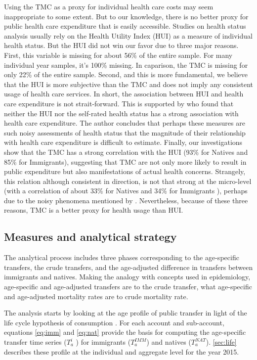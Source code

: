\vspace{0.7em}\par
Using the TMC as a proxy for individual health care costs may seem inappropriate to some extent.
But to our knowledge, there is no better proxy for public health care expenditure that is easily accessible.
Studies on health status analysis usually rely on the Health Utility Index (HUI) as a measure of individual health status.
But the HUI did not win our favor due to three major reasons.
First, this variable is missing for about 56\% of the entire sample.
For many individual year samples, it's 100\% missing.
In caparison, the TMC is missing for only 22\% of the entire sample.
Second, and this is more fundamental, we believe that the HUI is more subjective than the TMC and does not imply any consistent usage of health care services.
In short, the association between HUI and health care expenditure is not strait-forward.
This is supported by \citet{Pierard:2016ik} who found that neither the HUI nor the self-rated health status has a strong association with health care expenditure.
The author concludes that perhaps these measures are such noisy assessments of health status that the magnitude of their relationship with health care expenditure is difficult to estimate.
Finally, our investigations show that the TMC has a strong correlation with the HUI (93\% for Natives and 85\% for Immigrants), suggesting that TMC are not only more likely to result in public expenditure but also manifestations of actual health concerns.
Strangely, this relation although consistent in direction, is not that strong at the micro-level (with a correlation of about 33\% for Natives and 34\% for Immigrants ), perhaps due to the noisy phenomena mentioned by \citet{Pierard:2016ik}.
Nevertheless, because of these three reasons, TMC is a better proxy for health usage than HUI.

\subsection{Measures and analytical strategy}

The analytical process includes three phases corresponding to the age-specific transfers, the crude transfers, and the age-adjusted difference in transfers between immigrants and natives.
Making the analogy with concepts used in epidemiology, age-specific and age-adjusted transfers are to the crude transfer, what age-specific and age-adjusted mortality rates are to crude mortality rate.

\vspace{0.7em}\par
The analysis starts by looking at the age profile of public transfer in light of the life cycle hypothesis of consumption \citep{Ando:1963ea,Deaton:2005vr}.
For each account and sub-account, equations \eqref{eq:imm} and \eqref{eq:nat} provide the basis for computing the age-specific transfer time series (\( T^{i}_a \) ) for immigrants (\(T^{IMM}_a\)) and natives (\( T^{NAT}_a \)). \autoref{sec:life} describes these profile at the individual and aggregate level for the year 2015.

